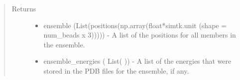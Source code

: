 \documentclass[letterpaper,12pt,english,openany,oneside]{sphinxmanual}
\begin{document}
\begin{fulllineitems}
\begin{quote}
\begin{description}
\begin{itemize}
\end{itemize}

\item[{Returns}] \leavevmode
\begin{itemize}
\item {} 
ensemble (List(positions(np.array(float*simtk.unit (shape = num\_beads x 3))))) - A list of the positions for all members in the ensemble.

\item {} 
ensemble\_energies ( List( )) - A list of the energies that were stored in the PDB files for the ensemble, if any.

\end{itemize}


\end{description}\end{quote}

\end{fulllineitems}

\end{document}
